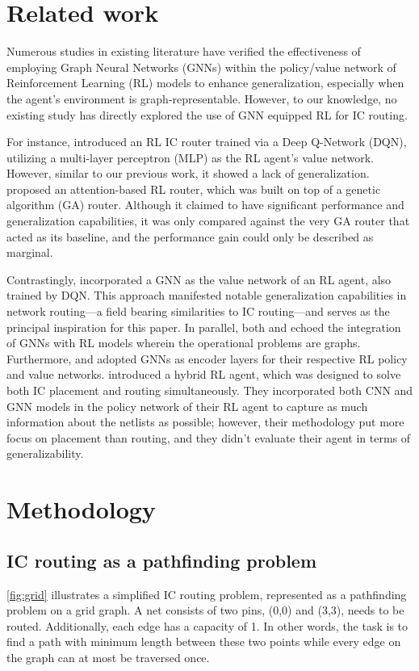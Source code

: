 \documentclass[letterpaper]{article}
\begin{document}
\section{Related work}
Numerous studies in existing literature have verified the effectiveness of
employing Graph Neural Networks (GNNs) within the policy/value network of
Reinforcement Learning (RL) models to enhance generalization, especially when
the agent’s environment is graph-representable. However, to our knowledge, no
existing study has directly explored the use of GNN equipped RL for IC routing.

For instance, \cite{Liao2020} introduced an RL IC router trained via a Deep
Q-Network (DQN), utilizing a multi-layer perceptron (MLP) as the RL agent's
value network. However, similar to our previous work, it showed a lack of
generalization. \cite{liao2020attention} proposed an attention-based RL router,
which was built on top of a genetic algorithm (GA) router. Although it claimed
to have significant performance and generalization capabilities, it was only
compared against the very GA router that acted as its baseline, and the
performance gain could only be described as marginal.

Contrastingly, \cite{Almasan2022} incorporated a GNN as the value network of an
RL agent, also trained by DQN. This approach manifested notable generalization
capabilities in network routing—a field bearing similarities to IC routing—and
serves as the principal inspiration for this paper. In parallel, both
\cite{Chen2023} and \cite{Wang2018} echoed the integration of GNNs with RL
models wherein the operational problems are graphs. Furthermore,
\cite{Mirhoseini2021} and \cite{Yue2022} adopted GNNs as encoder layers for
their respective RL policy and value networks. \cite{Cheng2021} introduced a
hybrid RL agent, which was designed to solve both IC placement and routing
simultaneously. They incorporated both CNN and GNN models in the policy network
of their RL agent to capture as much information about the netlists as possible;
however, their methodology put more focus on placement than routing, and they
didn't evaluate their agent in terms of generalizability.

    
\section{Methodology}

\subsection{IC routing as a pathfinding problem}
\autoref{fig:grid} illustrates a simplified IC routing problem, represented as a
pathfinding problem on a grid graph. A net consists of two pins, (0,0) and
(3,3), needs to be routed. Additionally, each edge has a capacity of 1. In other
words, the task is to find a path with minimum length between these two points
while every edge on the graph can at most be traversed once.
\end{document}
